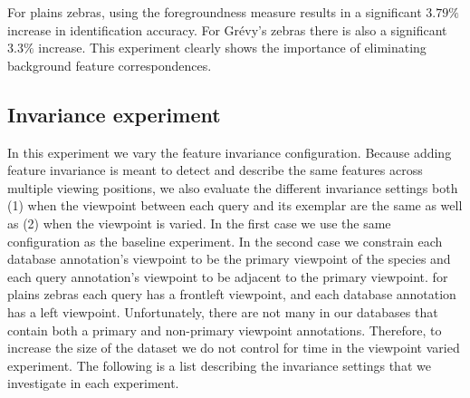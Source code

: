         For plains zebras, using the foregroundness measure results in a significant $3.79\percent$ increase in
          identification accuracy.
        For Grévy's zebras there is also a significant  $3.3\percent$ increase.
        This experiment clearly shows the importance of eliminating background feature correspondences.
     
    \subsection{Invariance experiment}\label{sub:exptinvar} 
        In this experiment we vary the feature invariance configuration.
        Because adding feature invariance is meant to detect and describe the same features across multiple viewing
          positions, we also evaluate the different invariance settings both
        (1) when the viewpoint between each query and its \groundtrue{} exemplar are the same as well as
        (2) when the viewpoint is varied.
        In the first case we use the same \timectrl{} configuration as the baseline experiment.
        In the second case we constrain each database annotation's viewpoint to be the primary viewpoint of the
          species and each query annotation's viewpoint to be adjacent to the primary viewpoint.
        \Eg{} for plains zebras each query has a frontleft viewpoint, and each database annotation has a left
          viewpoint.
        Unfortunately, there are not many \names{} in our databases that contain both a primary and non-primary
          viewpoint annotations.
        Therefore, to increase the size of the dataset we do not control for time in the viewpoint varied experiment.
        The following is a list describing the invariance settings that we investigate in each experiment.

